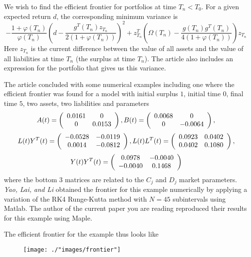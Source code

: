 \documentclass[12pt]{amsart}
\theoremstyle{definition}
\begin{document}
We wish to find the efficient frontier for portfolios at time $T_n < T_0$.  
For a given expected return $d$, the corresponding minimum variance is
$$-\frac{1 + \varphi(T_n)}{\varphi(T_n)}\left( d - \frac{g^T(T_n)z_{T_n}}{2(1 + \varphi(T_n))} \right)^2
+ z_{T_n}^T\left(\Omega(T_n) - \frac{g(T_n)g^T(T_n)}{4(1 + \varphi(T_n))}\right)z_{T_n}$$
Here $z_{T_n}$ is the current difference between the value of all assets and the value of all liabilities
at time $T_n$ (the surplus at time $T_n$). The article also includes an expression for the portfolio that gives us this variance.

The article concluded with some numerical examples including one where the efficient frontier was
found for a model with initial surplus $1$, initial time $0$, final time $5$, two assets, two liabilities and parameters
$$A(t) = \left( \begin{array}{c c} 
0.0161 & 0 \\
0 & 0.0153
\end{array} \right),
B(t) = \left( \begin{array}{c c} 
0.0068 & 0 \\
0 & -0.0064
\end{array} \right),$$
$$
L(t)Y^T(t) = \left( \begin{array}{c c} 
-0.0528 & -0.0119 \\
0.0014 & -0.0812
\end{array} \right),
L(t)L^T(t) = \left( \begin{array}{c c} 
0.0923 & 0.0402 \\
0.0402 & 0.1080
\end{array} \right),
$$
$$
Y(t)Y^T(t) = \left( \begin{array}{c c} 
0.0978 & -0.0040 \\
-0.0040 & 0.1468
\end{array} \right)
$$
where the bottom 3 matrices are related to the $C_j$ and $D_j$ market parameters.
\textit{Yao, Lai, and Li} obtained the frontier for this example numerically by applying a variation 
of the RK4 Runge-Kutta method with $N = 45$ subintervals using Matlab. 
The author of the current paper you are reading reproduced their results for this example
using Maple. 

The efficient frontier for the example thus looks like
\begin{figure}[!htb]
   \centering
   \texttt{[image: ./"images/frontier"]}
 \end{figure}
 
\end{document}
